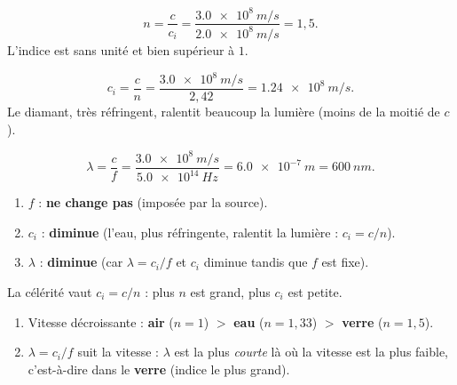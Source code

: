 \documentclass[11pt,a4paper]{article}
\begin{document}
\begin{corrige}
\[ n=\frac{c}{c_i}=\frac{\qty{3.0e8}{m/s}}{\qty{2.0e8}{m/s}}=1{,}5. \]
L'indice est sans unité et bien supérieur à $1$.
\end{corrige}

\begin{corrige}
\[ c_i=\frac{c}{n}=\frac{\qty{3.0e8}{m/s}}{2{,}42}=\qty{1.24e8}{m/s}. \]
Le diamant, très réfringent, ralentit beaucoup la lumière (moins de la moitié de $c$).
\end{corrige}

\begin{corrige}
\[ \lambda=\frac{c}{f}=\frac{\qty{3.0e8}{m/s}}{\qty{5.0e14}{Hz}}=\qty{6.0e-7}{m}=\qty{600}{nm}. \]
\end{corrige}

\begin{corrige}
\begin{enumerate}[label=\alph*)]
  \item $f$ : \textbf{ne change pas} (imposée par la source).
  \item $c_i$ : \textbf{diminue} (l'eau, plus réfringente, ralentit la lumière : $c_i=c/n$).
  \item $\lambda$ : \textbf{diminue} (car $\lambda=c_i/f$ et $c_i$ diminue tandis que $f$ est fixe).
\end{enumerate}
\end{corrige}

\begin{corrige}
La célérité vaut $c_i=c/n$ : plus $n$ est grand, plus $c_i$ est petite.
\begin{enumerate}[label=\alph*)]
  \item Vitesse décroissante : \textbf{air} ($n=1$) $>$ \textbf{eau} ($n=1{,}33$) $>$ \textbf{verre}
        ($n=1{,}5$).
  \item $\lambda=c_i/f$ suit la vitesse : $\lambda$ est la plus \emph{courte} là où la vitesse est la
        plus faible, c'est-à-dire dans le \textbf{verre} (indice le plus grand).
\end{enumerate}
\end{corrige}
\end{document}
